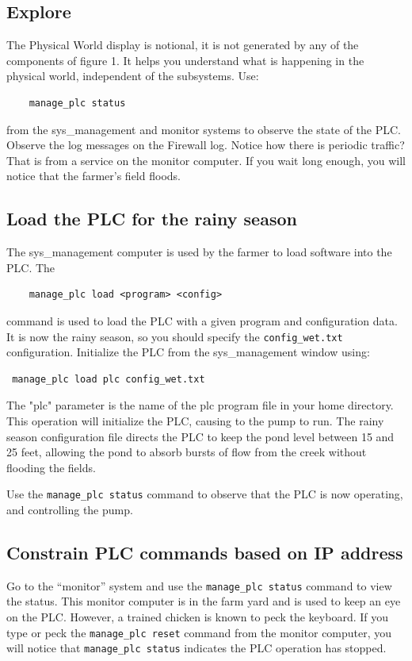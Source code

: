 \subsection{Explore}
The Physical World display is notional, it is not generated by any of the components of figure 1.  It 
helps you understand what is happening in the physical world, independent of the subsystems.
Use:
\begin{verbatim}
	manage_plc status
\end{verbatim}
from the sys\_management and monitor systems to observe the state of the PLC.  Observe the log 
messages on the Firewall log.  Notice how there is periodic traffic?  That is from a service on 
the monitor computer.  If you wait long enough, you will notice that the farmer's field floods.

\subsection{Load the PLC for the rainy season}
The sys\_management computer is used by the farmer to load software into the PLC.  The
\begin{verbatim}
    manage_plc load <program> <config> 
\end{verbatim}
\noindent command is used to  load the PLC with a given program and configuration data.
It is now the rainy season, so you should specify the {\tt config\_wet.txt} configuration.  
Initialize the PLC from the sys\_management window using:
\begin{verbatim}
 manage_plc load plc config_wet.txt
\end{verbatim}
The "plc" parameter is the name of the plc program file in your home directory. This operation 
will initialize the PLC, causing to the pump to run.
The rainy season configuration file directs the PLC to keep the pond level between 15 and 25 feet,  
allowing the pond to absorb bursts of flow from the creek without flooding the fields.

Use the {\tt manage\_plc status} command to observe that the PLC is now operating, and controlling the pump.

\subsection{Constrain PLC commands based on IP address}
Go to the ``monitor'' system and use the {\tt manage\_plc status} command to view the status.
This monitor computer is in the farm yard and is used to keep an eye on the PLC.  However, a trained chicken
is known to peck the keyboard.  If you type or peck the {\tt manage\_plc reset} command from the monitor computer,
you will notice that {\tt manage\_plc status} indicates the PLC operation has stopped.

